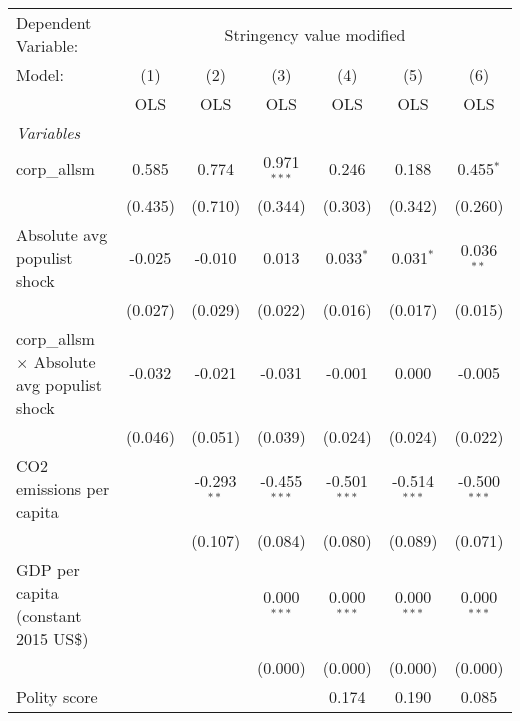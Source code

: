 
\begingroup
\centering
\begin{tabular}{lcccccc}
   \toprule
   Dependent Variable: & \multicolumn{6}{c}{Stringency value modified}\\
   Model:                                             & (1)     & (2)           & (3)            & (4)            & (5)            & (6)\\  
                                                      &  OLS    & OLS           & OLS            & OLS            & OLS            & OLS\\  
   \midrule
   \emph{Variables}\\
   corp\_allsm                                        & 0.585   & 0.774         & 0.971$^{***}$  & 0.246          & 0.188          & 0.455$^{*}$\\   
                                                      & (0.435) & (0.710)       & (0.344)        & (0.303)        & (0.342)        & (0.260)\\   
   Absolute avg populist shock                        & -0.025  & -0.010        & 0.013          & 0.033$^{*}$    & 0.031$^{*}$    & 0.036$^{**}$\\   
                                                      & (0.027) & (0.029)       & (0.022)        & (0.016)        & (0.017)        & (0.015)\\   
   corp\_allsm $\times$ Absolute avg populist shock   & -0.032  & -0.021        & -0.031         & -0.001         & 0.000          & -0.005\\   
                                                      & (0.046) & (0.051)       & (0.039)        & (0.024)        & (0.024)        & (0.022)\\   
   CO2 emissions per capita                           &         & -0.293$^{**}$ & -0.455$^{***}$ & -0.501$^{***}$ & -0.514$^{***}$ & -0.500$^{***}$\\   
                                                      &         & (0.107)       & (0.084)        & (0.080)        & (0.089)        & (0.071)\\   
   GDP per capita (constant 2015 US\$)                &         &               & 0.000$^{***}$  & 0.000$^{***}$  & 0.000$^{***}$  & 0.000$^{***}$\\   
                                                      &         &               & (0.000)        & (0.000)        & (0.000)        & (0.000)\\   
   Polity score                                       &         &               &                & 0.174          & 0.190          & 0.085\\   

\end{tabular}
